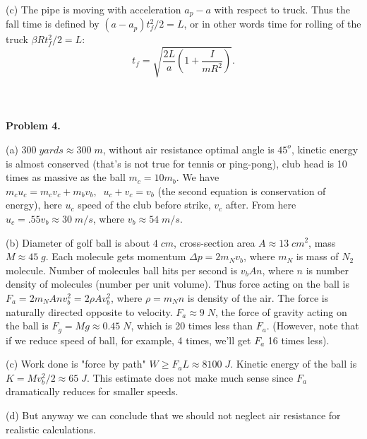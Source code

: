 \documentclass[12pt]{article}
\begin{document}
(c)  The pipe is moving with acceleration $a_p-a$ with respect to truck. Thus the fall time is defined by
$(a-a_p)t_f^2/2=L$, or in other words time for rolling of the truck $\beta R t_f^2/2=L$:
$$t_f=\sqrt{\frac{2L}{a}\left(1+\frac{I}{mR^2}\right)}.$$
\\
\\
\\


{\bf Problem 4.}

(a) $300\;yards\approx 300\;m$, without air resistance optimal angle is $45^o$, kinetic energy is almost conserved (that's is not true for tennis or ping-pong), club head is 10 times as massive as the ball $m_c =10 m_b$. We have $m_c u_c=m_c v_c +m_b v_b,\;\;u_c+v_c=v_b$ (the second equation is conservation of energy), here $u_c$ speed of the club before strike, $v_c$ after. From here $u_c=.55 v_b\approx 30\;m/s$, where $v_b\approx54\;m/s$.

(b) Diameter of golf ball is about $4\;cm$, cross-section area $A\approx 13\;cm^2$, mass $M\approx 45\;g$. Each molecule
gets momentum $\Delta p = 2 m_N v_b$, where $m_N$ is mass of $N_2$ molecule.
Number of molecules ball hits per second is $v_b A n$, where $n$ is number density of molecules (number per unit volume). Thus force acting on the ball is $F_a=2 m_N A n v_b^2=2\rho A v_b^2$, where $\rho=m_N n$ is density of the air. The force is naturally directed opposite to velocity. $F_a\approx 9\;N$, the force of gravity acting on the ball is $F_g=Mg\approx0.45\;N$, which is 20 times less than $F_a$. (However, note that if we 
reduce speed of ball, for example, 4 times, we'll get $F_a$ 16 times less).

(c) Work done is "force by path" $W\ge F_a L\approx 8100\;J$. Kinetic energy of the ball is $K=Mv_b^2/2\approx 65\;J$. This estimate does not make much sense since $F_a$ dramatically reduces for smaller speeds.

(d) But anyway we can conclude that we should not neglect air resistance for realistic calculations.
\end{document}

